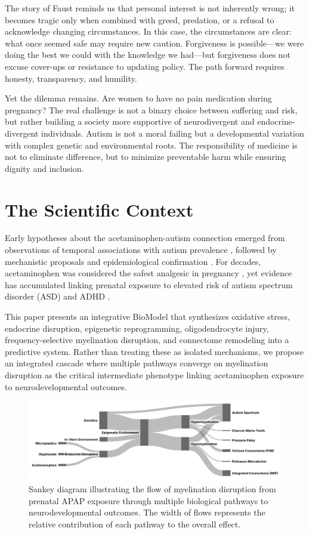 \documentclass[12pt]{article}
\begin{document}
The story of Faust reminds us that personal interest is not inherently wrong; it becomes tragic only when combined with greed, predation, or a refusal to acknowledge changing circumstances. In this case, the circumstances are clear: what once seemed safe may require new caution. Forgiveness is possible---we were doing the best we could with the knowledge we had---but forgiveness does not excuse cover-ups or resistance to updating policy. The path forward requires honesty, transparency, and humility.

Yet the dilemma remains. Are women to have no pain medication during pregnancy? The real challenge is not a binary choice between suffering and risk, but rather building a society more supportive of neurodivergent and endocrine-divergent individuals. Autism is not a moral failing but a developmental variation with complex genetic and environmental roots. The responsibility of medicine is not to eliminate difference, but to minimize preventable harm while ensuring dignity and inclusion.

\section{The Scientific Context}

Early hypotheses about the acetaminophen-autism connection emerged from observations of temporal associations with autism prevalence \citep{schultz2008, torres2003, shaw2013}, followed by mechanistic proposals \citep{parker2020} and epidemiological confirmation \citep{liew2016, avella-garcia2016}. For decades, acetaminophen was considered the safest analgesic in pregnancy \citep{kristensen2016}, yet evidence has accumulated linking prenatal exposure to elevated risk of autism spectrum disorder (ASD) and ADHD \citep{masarwa2018, chen2023}.

This paper presents an integrative BioModel that synthesizes oxidative stress, endocrine disruption, epigenetic reprogramming, oligodendrocyte injury, frequency-selective myelination disruption, and connectome remodeling into a predictive system. Rather than treating these as isolated mechanisms, we propose an integrated cascade where multiple pathways converge on myelination disruption as the critical intermediate phenotype linking acetaminophen exposure to neurodevelopmental outcomes.

\begin{figure}[h]
\centering
\includegraphics[width=\textwidth]{../assets/Myelination-Sankey.jpg}
\caption{Sankey diagram illustrating the flow of myelination disruption from prenatal APAP exposure through multiple biological pathways to neurodevelopmental outcomes. The width of flows represents the relative contribution of each pathway to the overall effect.}
\label{fig:sankey}
\end{figure}
\end{document}
